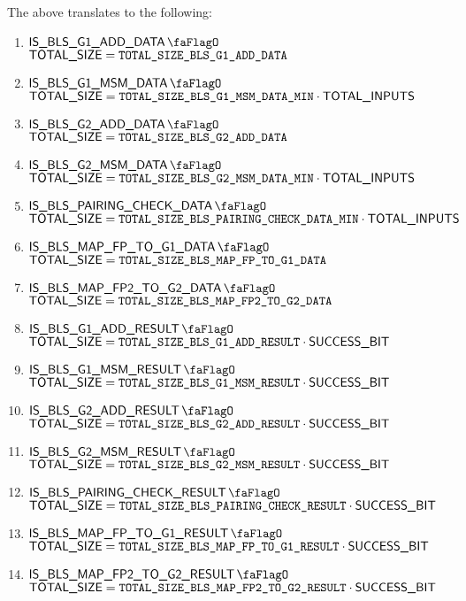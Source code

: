 \saNote{} The above translates to the following:
\begin{enumerate}
    \item \If $\isBlsGOneAddData$         \Then $\textsf{TOTAL\_SIZE} = \texttt{TOTAL\_SIZE\_BLS\_G1\_ADD\_DATA}$
    \item \If $\isBlsGOneMsmData$         \Then $\textsf{TOTAL\_SIZE} = \texttt{TOTAL\_SIZE\_BLS\_G1\_MSM\_DATA\_MIN} \cdot \textsf{TOTAL\_INPUTS}$
    \item \If $\isBlsGTwoAddData$         \Then $\textsf{TOTAL\_SIZE} = \texttt{TOTAL\_SIZE\_BLS\_G2\_ADD\_DATA}$
    \item \If $\isBlsGTwoMsmData$         \Then $\textsf{TOTAL\_SIZE} = \texttt{TOTAL\_SIZE\_BLS\_G2\_MSM\_DATA\_MIN} \cdot \textsf{TOTAL\_INPUTS}$
    \item \If $\isBlsPairingCheckData$    \Then $\textsf{TOTAL\_SIZE} = \texttt{TOTAL\_SIZE\_BLS\_PAIRING\_CHECK\_DATA\_MIN} \cdot \textsf{TOTAL\_INPUTS}$
    \item \If $\isBlsMapFpToGOneData$     \Then $\textsf{TOTAL\_SIZE} = \texttt{TOTAL\_SIZE\_BLS\_MAP\_FP\_TO\_G1\_DATA}$
    \item \If $\isBlsMapFpTwoToGTwoData$  \Then $\textsf{TOTAL\_SIZE} = \texttt{TOTAL\_SIZE\_BLS\_MAP\_FP2\_TO\_G2\_DATA}$
    \item \If $\isBlsGOneAddResult$       \Then $\textsf{TOTAL\_SIZE} = \texttt{TOTAL\_SIZE\_BLS\_G1\_ADD\_RESULT} \cdot \textsf{SUCCESS\_BIT}$
    \item \If $\isBlsGOneMsmResult$       \Then $\textsf{TOTAL\_SIZE} = \texttt{TOTAL\_SIZE\_BLS\_G1\_MSM\_RESULT} \cdot \textsf{SUCCESS\_BIT}$
    \item \If $\isBlsGTwoAddResult$       \Then $\textsf{TOTAL\_SIZE} = \texttt{TOTAL\_SIZE\_BLS\_G2\_ADD\_RESULT} \cdot \textsf{SUCCESS\_BIT}$
    \item \If $\isBlsGTwoMsmResult$       \Then $\textsf{TOTAL\_SIZE} = \texttt{TOTAL\_SIZE\_BLS\_G2\_MSM\_RESULT} \cdot \textsf{SUCCESS\_BIT}$
    \item \If $\isBlsPairingCheckResult$  \Then $\textsf{TOTAL\_SIZE} = \texttt{TOTAL\_SIZE\_BLS\_PAIRING\_CHECK\_RESULT} \cdot \textsf{SUCCESS\_BIT}$
    \item \If $\isBlsMapFpToGOneResult$   \Then $\textsf{TOTAL\_SIZE} = \texttt{TOTAL\_SIZE\_BLS\_MAP\_FP\_TO\_G1\_RESULT} \cdot \textsf{SUCCESS\_BIT}$
    \item \If $\isBlsMapFpTwoToGTwoResult$ \Then $\textsf{TOTAL\_SIZE} = \texttt{TOTAL\_SIZE\_BLS\_MAP\_FP2\_TO\_G2\_RESULT} \cdot \textsf{SUCCESS\_BIT}$
\end{enumerate}

